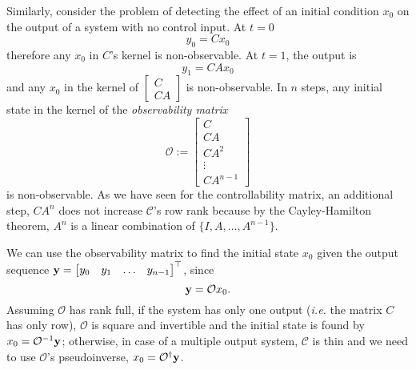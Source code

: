 Similarly, consider the problem of detecting the effect of an initial condition $x_0$ on the output of a system with no control input. At $t=0$
\begin{equation*}
  y_0 = Cx_0
\end{equation*}
therefore any $x_0$ in $C$'s kernel is non-observable. At $t=1$, the output is
\begin{equation*}
  y_1 = CAx_0
\end{equation*}
and any $x_0$ in the kernel of $\begin{bmatrix} C \\ CA \end{bmatrix}$ is non-observable. In $n$ steps, any initial state in the kernel of the \emph{observability matrix}
\begin{equation}
  \label{eq:observability-matrix}
  \mathcal{O} :=
  \begin{bmatrix}
    C \\ CA \\ CA^2 \\ \vdots \\ CA^{n-1}
  \end{bmatrix}
\end{equation}
is non-observable. As we have seen for the controllability matrix, an additional step, $CA^n$ does not increase $\mathcal{C}$'s row rank because by the Cayley-Hamilton theorem, $A^n$ is a linear combination of $\{I, A,\ldots, A^{n-1}\}$.

We can use the observability matrix to find the initial state $x_0$ given the output sequence $\boldsymbol{\mathrm{y}} = \begin{bmatrix}
    y_0 & y_1 & \ldots & y_{n-1}
  \end{bmatrix}^\top$, since
\begin{equation*}
  \boldsymbol{\mathrm{y}} = \mathcal{O}x_0.
\end{equation*}
Assuming $\mathcal{O}$ has rank full, if the system has only one output (\textit{i.e.} the matrix $C$ has only row), $\mathcal{O}$ is square and invertible and the initial state is found by $x_0 = \mathcal{O}^{-1}\boldsymbol{\mathrm{y}}$; otherwise, in case of a multiple output system, $\mathcal{C}$ is thin and we need to use $\mathcal{O}$'s pseudoinverse, $x_0=\mathcal{O}^\dagger\boldsymbol{\mathrm{y}}$.

